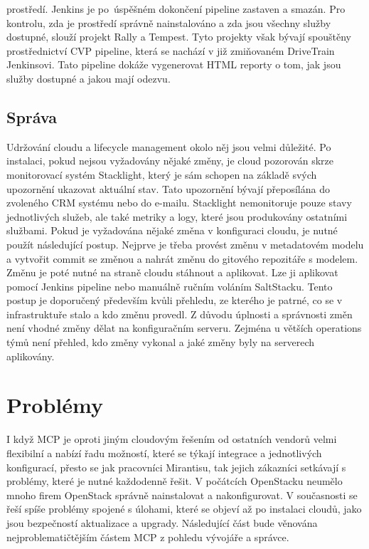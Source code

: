 prostředí. Jenkins je po úspěšném dokončení pipeline zastaven a smazán. Pro kontrolu, zda je prostředí správně nainstalováno a zda jsou všechny služby dostupné, slouží projekt Rally a Tempest. Tyto projekty však bývají spouštěny prostřednictví CVP pipeline, která se nachází v již zmiňovaném DriveTrain Jenkinsovi. Tato pipeline dokáže vygenerovat HTML reporty o tom, jak jsou služby dostupné a jakou mají odezvu.

\subsection{Správa}
Udržování cloudu a lifecycle management okolo něj jsou velmi důležité. Po instalaci, pokud nejsou vyžadovány nějaké změny, je cloud pozorován skrze monitorovací systém Stacklight, který je sám schopen na základě svých upozornění ukazovat aktuální stav. Tato upozornění bývají přeposílána do zvoleného CRM systému nebo do e-mailu. Stacklight nemonitoruje pouze stavy jednotlivých služeb, ale také metriky a logy, které jsou produkovány ostatními službami. Pokud je vyžadována nějaké změna v konfiguraci cloudu, je nutné použít následující postup. Nejprve je třeba provést změnu v metadatovém modelu a vytvořit commit se změnou a nahrát změnu do gitového repozitáře s modelem. Změnu je poté nutné na straně cloudu stáhnout a aplikovat. Lze ji aplikovat pomocí Jenkins pipeline nebo manuálně ručním voláním SaltStacku. Tento postup je doporučený především kvůli přehledu, ze kterého je patrné, co se v infrastruktuře stalo a kdo změnu provedl. Z důvodu úplnosti a správnosti změn není vhodné změny dělat na konfiguračním serveru. Zejména u větších operations týmů není přehled, kdo změny vykonal a jaké změny byly na serverech aplikovány.

\section{Problémy}
I když MCP je oproti jiným cloudovým řešením od ostatních vendorů velmi flexibilní a nabízí řadu možností, které se týkají integrace a jednotlivých konfigurací, přesto se jak pracovníci Mirantisu, tak jejich zákazníci setkávají s problémy, které je nutné každodenně řešit. V počátcích OpenStacku neumělo mnoho firem OpenStack správně nainstalovat a nakonfigurovat. V současnosti se řeší spíše problémy spojené s úlohami, které se objeví až po instalaci cloudů, jako jsou bezpečností aktualizace a upgrady. Následující část bude věnována nejproblematičtějším částem MCP z pohledu vývojáře a správce.

